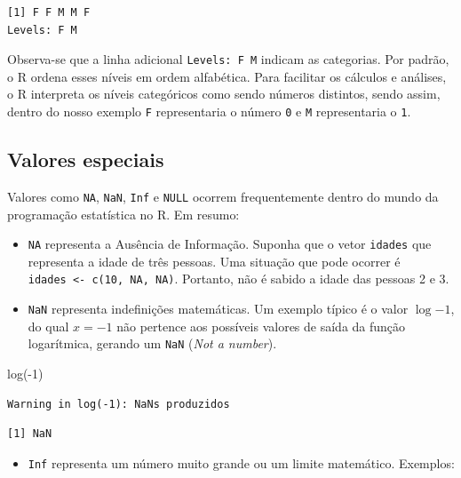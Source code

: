 \documentclass[
  12pt,
  letterpaper,
  DIV=11,
  numbers=noendperiod]{scrreprt}
\newenvironment{Shaded}{\begin{snugshade}}{\end{snugshade}}
\newcommand{\DecValTok}[1]{\textcolor[rgb]{0.68,0.00,0.00}{#1}}
\newcommand{\FunctionTok}[1]{\textcolor[rgb]{0.28,0.35,0.67}{#1}}
\newcommand{\NormalTok}[1]{\textcolor[rgb]{0.00,0.23,0.31}{#1}}
\newcommand{\SpecialCharTok}[1]{\textcolor[rgb]{0.37,0.37,0.37}{#1}}
\providecommand{\tightlist}{%
  \setlength{\itemsep}{0pt}\setlength{\parskip}{0pt}}\usepackage{longtable,booktabs,array}
\theoremstyle{definition}
\theoremstyle{exemplo}
\begin{document}
\begin{verbatim}
[1] F F M M F
Levels: F M
\end{verbatim}

\noindent Observa-se que a linha adicional \texttt{Levels:\ F\ M}
indicam as categorias. Por padrão, o R ordena esses níveis em ordem
alfabética. Para facilitar os cálculos e análises, o R interpreta os
níveis categóricos como sendo números distintos, sendo assim, dentro do
nosso exemplo \texttt{F} representaria o número \texttt{0} e \texttt{M}
representaria o \texttt{1}.

\subsection{Valores especiais}\label{valores-especiais}

Valores como \texttt{NA}, \texttt{NaN}, \texttt{Inf} e \texttt{NULL}
ocorrem frequentemente dentro do mundo da programação estatística no R.
Em resumo:

\begin{itemize}
\tightlist
\item
  \texttt{NA} representa a Ausência de Informação. Suponha que o vetor
  \texttt{idades} que representa a idade de três pessoas. Uma situação
  que pode ocorrer é \texttt{idades\ \textless{}-\ c(10,\ NA,\ NA)}.
  Portanto, não é sabido a idade das pessoas 2 e 3.
\item
  \texttt{NaN} representa indefinições matemáticas. Um exemplo típico é
  o valor \(\log{-1}\), do qual \(x = -1\) não pertence aos possíveis
  valores de saída da função logarítmica, gerando um \texttt{NaN}
  (\emph{Not a number}).
\end{itemize}

\begin{Shaded}
\begin{Highlighting}[]
\FunctionTok{log}\NormalTok{(}\SpecialCharTok{{-}}\DecValTok{1}\NormalTok{)}
\end{Highlighting}
\end{Shaded}

\begin{verbatim}
Warning in log(-1): NaNs produzidos
\end{verbatim}

\begin{verbatim}
[1] NaN
\end{verbatim}

\begin{itemize}
\tightlist
\item
  \texttt{Inf} representa um número muito grande ou um limite
  matemático. Exemplos:
\end{itemize}
\end{document}
